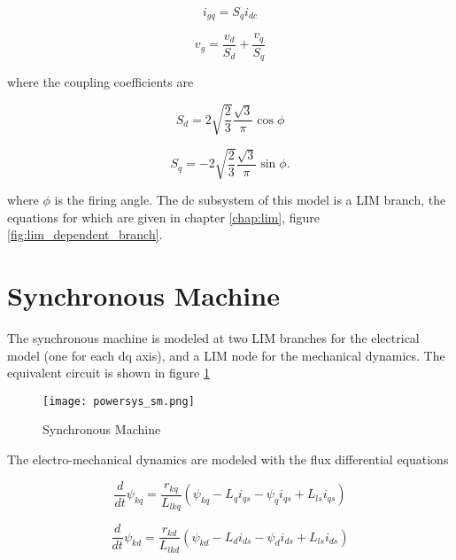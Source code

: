 \begin{equation} \label{eq:trload_igq}
    i_{gq}=S_{q}i_{dc}   
\end{equation}

\begin{equation} \label{eq:trload_vg}
    v_{g} = \frac{v_{d}}{S_{d}} + \frac{v_{q}}{S_{q}}   
\end{equation}

where the coupling coefficients are

\begin{equation} \label{eq:trload_sd}
    S_{d} = 2 \sqrt{\frac{2}{3}} \frac{\sqrt{3}}{\pi} \cos{\phi}    
\end{equation}

\begin{equation} \label{eq:trload_sq}
    S_{q} = -2 \sqrt{\frac{2}{3}} \frac{\sqrt{3}}{\pi} \sin{\phi}.    
\end{equation}

where $\phi$ is the firing angle. The dc subsystem of this model is a LIM branch, the equations for which are given in chapter \ref{chap:lim}, figure \ref{fig:lim_dependent_branch}.

\section{Synchronous Machine}

The synchronous machine \cite{abdelwahed2013} is modeled at two LIM branches for the electrical model (one for each dq axis), and a LIM node for the mechanical dynamics. The equivalent circuit is shown in figure \ref{fig:powersys_sm}

\begin{figure}[h]
    \label{fig:powersys_sm}
    \centering
    \texttt{[image: powersys\_sm.png]}
    \caption{Synchronous Machine}
\end{figure}

The electro-mechanical dynamics are modeled with the flux differential equations

\begin{equation}
\frac{d}{dt} \psi_{kq} = \frac{r_{kq}}{L_{lkq}} \left( \psi_{kq} - L_{q} i_{qs} - \psi_{q} i_{qs}+L_{ls} i_{qs} \right)
\end{equation}

\begin{equation}
    \frac{d}{dt} \psi_{kd} = \frac{r_{kd}}{L_{lkd}} \left( \psi_{kd} - L_{d} i_{ds} - \psi_{d} i_{ds}+L_{ls} i_{ds} \right)
\end{equation}

